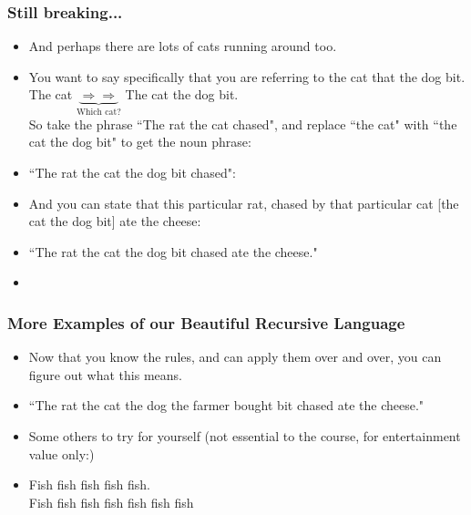  \begin{frame}
\frametitle{Still breaking...}

\begin{itemize}[<+->]
\item 
And perhaps there are lots of cats running around too.

\item  You want to say specifically that you are referring to the cat that the dog bit.\\
 
  The cat $\underbrace{\Longrightarrow\Longrightarrow}_{\text{Which cat?}}$ The cat the dog bit.\\[3ex]
  
So take the phrase ``The rat the cat chased", and replace ``the cat" with ``the cat the dog bit" to get the noun phrase:

\item ``The rat the cat the dog bit chased":

\item And you can state that this particular rat, chased by that particular cat [the cat the dog bit] ate the cheese:

\item ``The rat the cat the dog bit chased ate the cheese."

\item []\end{itemize} 
\end{frame}

 \begin{frame}
\frametitle{More Examples of our Beautiful Recursive Language}

\begin{itemize}[<+->]
\item 

Now that you know the rules, and can apply them over and over, you can figure out what this means.

\item ``The rat the cat the dog the farmer bought bit chased ate the cheese." 

\item Some others to try for yourself (not essential to the course, for entertainment value only:)

\item 
Fish fish fish fish fish. \\ %
Fish fish fish fish fish fish fish 


\end{itemize} 
\end{frame}


